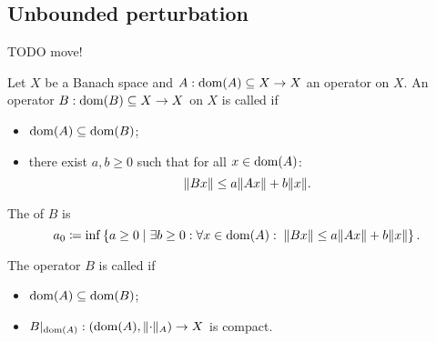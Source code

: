 \subsection{Unbounded perturbation}
TODO move!

\begin{definition}
Let $X$ be a Banach space and $A: \operatorname{dom}(A)\subseteq X\to X$ an operator on $X$. An operator $B: \operatorname{dom}(B)\subseteq X\to X$ on $X$ is called  if
\begin{itemize}
\item $\operatorname{dom}(A) \subseteq \operatorname{dom}(B)$;
\item there exist $a,b\geq 0$ such that for all $x\in \operatorname{dom}(A)$:
\[ \lVert Bx\rVert \leq a\lVert Ax\rVert + b\lVert x\rVert. \]
\end{itemize}
The  of $B$ is
\[ a_0 \coloneqq \inf\left\{ a\geq 0 \;\middle|\; \exists b\geq 0: \forall x\in\operatorname{dom}(A): \;\lVert Bx\rVert \leq a\lVert Ax\rVert + b\lVert x\rVert \right\}. \]

The operator $B$ is called  if
\begin{itemize}
\item $\operatorname{dom}(A) \subseteq \operatorname{dom}(B)$;
\item $B|_{\operatorname{dom}(A)}: \left( \operatorname{dom}(A), \lVert\cdot\rVert_A \right) \to X$ is compact.
\end{itemize}
\end{definition}

